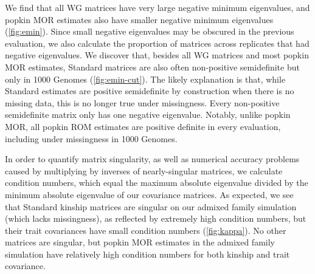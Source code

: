 \documentclass[11pt]{article}
\begin{document}
We find that all WG matrices have very large negative minimum eigenvalues, and popkin MOR estimates also have smaller negative minimum eigenvalues (\cref{fig:emin}).
Since small negative eigenvalues may be obscured in the previous evaluation, we also calculate the proportion of matrices across replicates that had negative eigenvalues.
We discover that, besides all WG matrices and most popkin MOR estimates, Standard matrices are also often non-positive semidefinite but only in 1000 Genomes (\cref{fig:emin-cut}).
The likely explanation is that, while Standard estimates are positive semidefinite by construction when there is no missing data, this is no longer true under missingness.
Every non-positive semidefinite matrix only has one negative eigenvalue.
Notably, unlike popkin MOR, all popkin ROM estimates are positive definite in every evaluation, including under missingness in 1000 Genomes.

In order to quantify matrix singularity, as well as numerical accuracy problems caused by multiplying by inverses of nearly-singular matrices, we calculate condition numbers, which equal the maximum absolute eigenvalue divided by the minimum absolute eigenvalue of our covariance matrices.
As expected, we see that Standard kinship matrices are singular on our admixed family simulation (which lacks missingness), as reflected by extremely high condition numbers, but their trait covariances have small condition numbers (\cref{fig:kappa}).
No other matrices are singular, but popkin MOR estimates in the admixed family simulation have relatively high condition numbers for both kinship and trait covariance.
\end{document}
